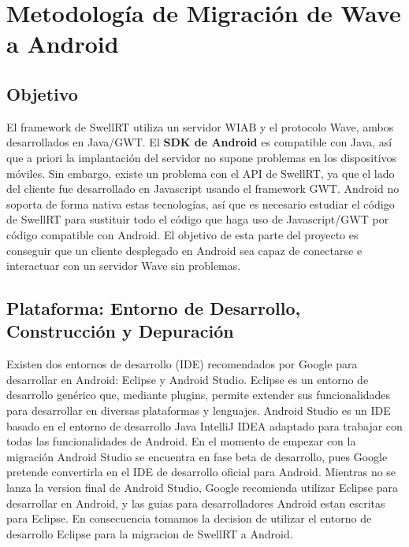 \section{Metodología de Migración de Wave a Android} \label{sec:migration}

  \subsection{Objetivo}
  
    El framework de SwellRT utiliza un servidor WIAB y el protocolo Wave, ambos desarrollados en Java/GWT. El \textbf{SDK de Android} \cite{ref:android_sdk} es compatible con Java, así que a priori la implantación del servidor no supone problemas en los dispositivos móviles. Sin embargo, existe un problema con el API de SwellRT, ya que el lado del cliente fue desarrollado en Javascript usando el framework GWT. Android no soporta de forma nativa estas tecnologías, así que es necesario estudiar el código de SwellRT para sustituir todo el código que haga uso de Javascript/GWT por código compatible con Android. El objetivo de esta parte del proyecto es conseguir que un cliente desplegado en Android sea capaz de conectarse e interactuar con un servidor Wave sin problemas.  
  
  \subsection{Plataforma: Entorno de Desarrollo, Construcción y Depuración}
  
    Existen dos entornos de desarrollo (IDE) recomendados por Google para desarrollar en Android: Eclipse \cite{ref:eclipse} y Android Studio.\cite{ref:android_studio} Eclipse es un entorno de desarrollo genérico que, mediante plugins, permite extender sus funcionalidades para desarrollar en diversas plataformas y lenguajes. Android Studio es un IDE basado en el entorno de desarrollo Java IntelliJ IDEA \cite{ref:intelliJ_Idea} adaptado para trabajar con todas las funcionalidades de Android. En el momento de empezar con la migración Android Studio se encuentra en fase beta de desarrollo, pues Google pretende convertirla en el IDE de desarrollo oficial para Android. Mientras no se lanza la version final de Android Studio, Google recomienda utilizar Eclipse para desarrollar en Android, y las guias para desarrolladores Android estan escritas para Eclipse. En consecuencia tomamos la decision de utilizar el entorno de desarrollo Eclipse para la migracion de SwellRT a Android. 

